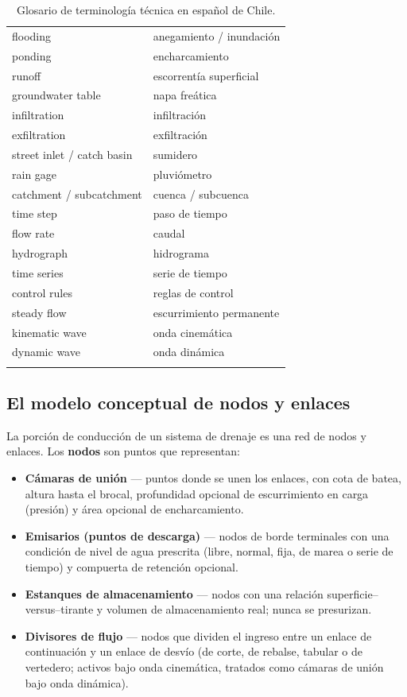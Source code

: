 \documentclass[11pt,a4paper]{article}
\begin{document}
\begin{longtable}{>{\raggedright}p{6.2cm}>{\raggedright\arraybackslash}p{9.2cm}}
flooding & anegamiento / inundación \\
ponding & encharcamiento \\
runoff & escorrentía superficial \\
groundwater table & napa freática \\
infiltration & infiltración \\
exfiltration & exfiltración \\
street inlet / catch basin & sumidero \\
rain gage & pluviómetro \\
catchment / subcatchment & cuenca / subcuenca \\
time step & paso de tiempo \\
flow rate & caudal \\
hydrograph & hidrograma \\
time series & serie de tiempo \\
control rules & reglas de control \\
steady flow & escurrimiento permanente \\
kinematic wave & onda cinemática \\
dynamic wave & onda dinámica \\
\bottomrule
\caption{Glosario de terminología técnica en español de Chile.}
\label{tab:glosario}
\end{longtable}

\subsection{El modelo conceptual de nodos y enlaces}

La porción de conducción de un sistema de drenaje es una red de nodos y
enlaces. Los \textbf{nodos} son puntos que representan:
\begin{itemize}[nosep]
  \item \textbf{Cámaras de unión} --- puntos donde se unen los enlaces, con
        cota de batea, altura hasta el brocal, profundidad opcional de
        escurrimiento en carga (presión) y área opcional de encharcamiento.
  \item \textbf{Emisarios (puntos de descarga)} --- nodos de borde terminales
        con una condición de nivel de agua prescrita (libre, normal, fija, de
        marea o serie de tiempo) y compuerta de retención opcional.
  \item \textbf{Estanques de almacenamiento} --- nodos con una relación
        superficie--versus--tirante y volumen de almacenamiento real; nunca se
        presurizan.
  \item \textbf{Divisores de flujo} --- nodos que dividen el ingreso entre un
        enlace de continuación y un enlace de desvío (de corte, de rebalse,
        tabular o de vertedero; activos bajo onda cinemática, tratados como
        cámaras de unión bajo onda dinámica).
\end{itemize}
\end{document}
